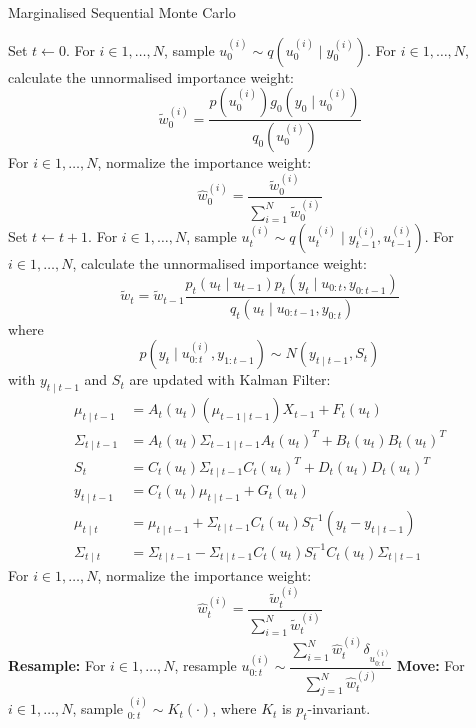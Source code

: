 \begin{algorithm}
\caption{Marginalised Sequential Monte Carlo}\label{algo:msmc}
\begin{algorithmic}[1]
\State Set $t \gets 0$.
\State For $i \in 1, \ldots, N$, sample $u^{(i)}_0 \sim q(u^{(i)}_0 \mid y^{(i)}_0)$.
\State For $i \in 1, \ldots, N$, calculate the unnormalised importance weight:
\begin{equation*}
 \tilde{w}^{(i)}_0 = \dfrac{p(u_0^{(i)})g_0(y_0 \mid u^{(i)}_0)}{q_0(u^{(i)}_0)}
\end{equation*}
\State For $i \in 1, \ldots, N$, normalize the importance weight:
\begin{equation*}
\hat{w}^{(i)}_0 = \dfrac{\tilde{w}^{(i)}_0}{\sum^N_{i=1} \tilde{w}^{(i)}_0}
\end{equation*}
\State Set $t \gets t + 1$.
\State For $i \in 1, \ldots, N$, sample $u^{(i)}_t \sim q(u^{(i)}_t \mid y^{(i)}_{t-1}, u^{(i)}_{t-1})$.
\State For $i \in 1, \ldots, N$, calculate the unnormalised importance weight:
\begin{equation*}
   \tilde{w}_t  = \tilde{w}_{t-1} \dfrac{p_t(u_t \mid u_{t-1})p_t(y_t \mid u_{0:t}, y_{0:t-1})}{q_t(u_t \mid u_{0:t-1}, y_{0:t})}
\end{equation*}
where
\begin{equation}
  p(y_t \mid u^{(i)}_{0:t}, y_{1:t-1}) \sim N(y_{t \mid t-1},S_t)
\end{equation}
with $y_{t \mid t-1}$ and $S_t$ are updated with Kalman Filter:
\begin{align}
  \mu_{t \mid t -1} &= A_{t}(u_t)(\mu_{t-1 \mid t-1})X_{t-1} + F_t(u_t) \nonumber \\
  \Sigma_{t \mid t -1} &= A_{t}(u_t)\Sigma_{t -1 \mid t -1}A_{t}(u_t)^T +  B_t(u_t)B_t(u_t)^T \nonumber\\
  S_t &=  C_{t}(u_t)\Sigma_{t \mid t -1}C_{t}(u_t)^T +  D_t(u_t)D_t(u_t)^T \nonumber\\
  y_{t \mid t-1} &=  C_{t}(u_t)  \mu_{t \mid t-1} + G_t(u_t) \nonumber\\
  \mu_{t \mid t} &=   \mu_{t \mid t -1} +   \Sigma_{t \mid t -1} C_{t}(u_t)S_t^{-1}(y_t - y_{t \mid t-1}) \nonumber\\
  \Sigma_{t \mid t} &=  \Sigma_{t \mid t -1} -\Sigma_{t \mid t -1} C_{t}(u_t)S_t^{-1} C_{t}(u_t)\Sigma_{t \nonumber \mid t -1}
\end{align}
\State For $i \in 1, \ldots, N$, normalize the importance weight:
\begin{equation*}
\hat{w}^{(i)}_t = \dfrac{\tilde{w}^{(i)}_t}{\sum^N_{i=1} \tilde{w}^{(i)}_t}
\end{equation*}
\State \textbf{Resample:} For $i \in 1, \ldots, N$, resample $ u^{(i)}_{0:t} \sim \dfrac{\sum^N_{i=1}\hat{w}^{(i)}_t\delta_{u^{(i)}_{0:t}}}{\sum^N_{j=1} \hat{w}^{(j)}_t}$
\State \textbf{Move:} For $i \in 1, \ldots, N$, sample $^{(i)}_{0:t} \sim K_t(\cdot)$, where $K_t$ is $p_t$-invariant.
\EndWhile
\EndFunction
\end{algorithmic}
\end{algorithm}

